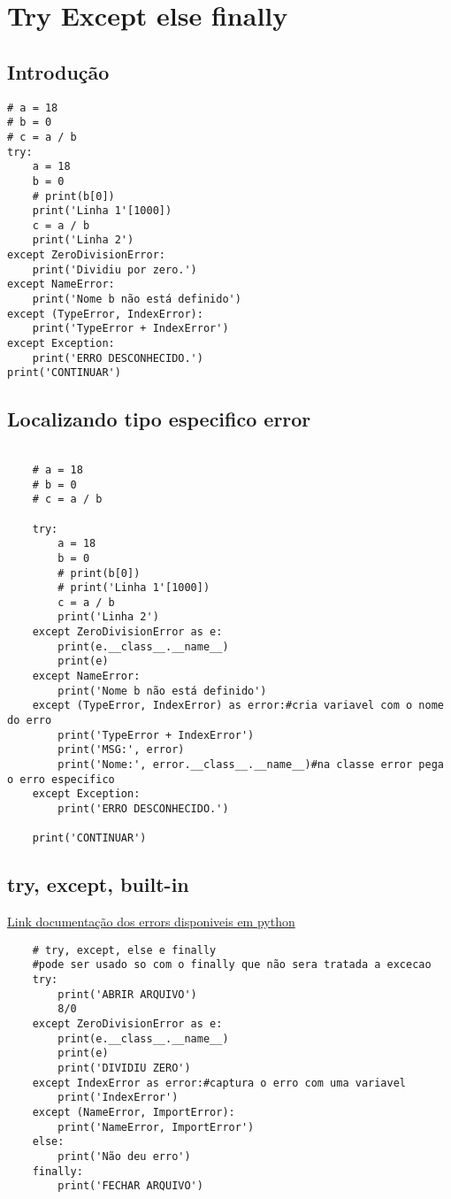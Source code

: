 \documentclass{article}
\begin{document}
\section{Try Except else finally}
\subsection{Introdução}
\begin{lstlisting}
# a = 18
# b = 0
# c = a / b
try:
    a = 18
    b = 0
    # print(b[0])
    print('Linha 1'[1000])
    c = a / b
    print('Linha 2')
except ZeroDivisionError:
    print('Dividiu por zero.')
except NameError:
    print('Nome b não está definido')
except (TypeError, IndexError):
    print('TypeError + IndexError')
except Exception:
    print('ERRO DESCONHECIDO.')
print('CONTINUAR')
\end{lstlisting}
\subsection{Localizando tipo especifico error}
\begin{lstlisting}
  
    # a = 18
    # b = 0
    # c = a / b
    
    try:
        a = 18
        b = 0
        # print(b[0])
        # print('Linha 1'[1000])
        c = a / b
        print('Linha 2')
    except ZeroDivisionError as e:
        print(e.__class__.__name__)
        print(e)
    except NameError:
        print('Nome b não está definido')
    except (TypeError, IndexError) as error:#cria variavel com o nome do erro
        print('TypeError + IndexError')
        print('MSG:', error)
        print('Nome:', error.__class__.__name__)#na classe error pega o erro especifico
    except Exception:
        print('ERRO DESCONHECIDO.')
    
    print('CONTINUAR')
\end{lstlisting}   
\subsection{try, except, built-in }
\href{ https://docs.python.org/pt-br/3/library/exceptions.html#built-in-exceptions}{Link documentação dos errors disponiveis em python}
\begin{lstlisting}
    # try, except, else e finally
    #pode ser usado so com o finally que não sera tratada a excecao
    try:
        print('ABRIR ARQUIVO')
        8/0
    except ZeroDivisionError as e:
        print(e.__class__.__name__)
        print(e)
        print('DIVIDIU ZERO')
    except IndexError as error:#captura o erro com uma variavel
        print('IndexError')
    except (NameError, ImportError):
        print('NameError, ImportError')
    else:
        print('Não deu erro')
    finally:
        print('FECHAR ARQUIVO')
\end{lstlisting}   
\end{document}
